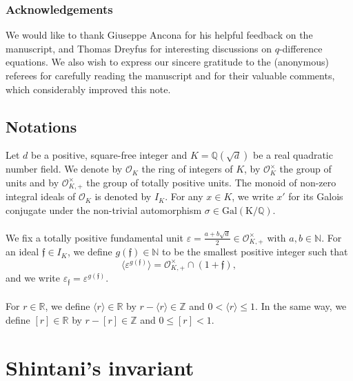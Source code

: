 \documentclass[11pt, a4paper]{amsart}
\newcommand{\ep}{\varepsilon}
\newcommand{\eq}[1]{\begin{equation}#1\end{equation}}
\theoremstyle{plain}
\numberwithin{equation}{section}
\begin{document}
\subsubsection*{Acknowledgements} We would like to thank Giuseppe Ancona for his helpful feedback on the manuscript, and Thomas Dreyfus for interesting discussions on $q$-difference equations. We also wish to express our sincere gratitude to the (anonymous) referees for carefully reading the manuscript and for their valuable comments, which considerably improved this note.
\subsection{Notations}
\noindent
Let $d$ be a positive, square-free integer and $K=\mathbb Q(\sqrt d)$ be a real quadratic number field. We denote by $\mathcal O _K$ the ring of integers of $K$, by $\mathcal O _K ^\times$ the group of units and by $\mathcal O _{K,+}^\times$ the group of totally positive units. The monoid of non-zero integral ideals of $\mathcal O _K$ is denoted by $I_K$. For any $x \in K$, we write $x'$ for its Galois conjugate under the non-trivial automorphism $\sigma \in \mathrm{Gal(K/\mathbb Q)}$. \\ \\
We fix a totally positive fundamental unit $\ep = \frac{a+b\sqrt{d}} 2 \in \mathcal O _{K,+} ^\times$ with $a,b \in \mathbb N$. For an ideal $\mathfrak f \in I_K$, we define $g(\mathfrak f) \in \mathbb N$ to be the smallest positive integer such that \eq{\langle \ep^{g(\mathfrak f)} \rangle = \mathcal O_{K,+}^\times \cap (1+\mathfrak f) ,} and we write $\ep_\mathfrak f = \ep^{g(\mathfrak f)}$. \\ \\
For $r \in \mathbb R$, we define $\langle r \rangle \in \mathbb R$ by $r - \langle r \rangle \in \mathbb Z$ and $0 < \langle r \rangle \leq 1$. In the same way, we define $[r] \in \mathbb R$ by $r - [r] \in \mathbb Z$ and $0\leq [r] < 1$.
 
 \section{Shintani's invariant}
 
\end{document}
